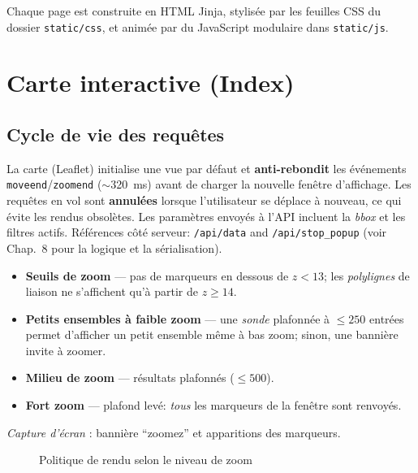 Chaque page est construite en HTML Jinja, stylisée par les feuilles CSS du dossier \texttt{static/css}, et animée par du JavaScript modulaire dans \texttt{static/js}.

\section{Carte interactive (Index)}

\subsection{Cycle de vie des requêtes}
La carte (Leaflet) initialise une vue par défaut et \textbf{anti-rebondit} les événements \texttt{moveend}/\texttt{zoomend} (\(\sim\)320~ms) avant de charger la nouvelle fenêtre d'affichage. Les requêtes en vol sont \textbf{annulées} lorsque l'utilisateur se déplace à nouveau, ce qui évite les rendus obsolètes. Les paramètres envoyés à l'API incluent la \textit{bbox} et les filtres actifs. Références côté serveur: \texttt{/api/data} and \texttt{/api/stop\_popup} (voir Chap.~8 pour la logique et la sérialisation).

\begin{itemize}
  \item \textbf{Seuils de zoom} — pas de marqueurs en dessous de \(z<13\); les \textit{polylignes} de liaison ne s'affichent qu'à partir de \(z\ge 14\).
  \item \textbf{Petits ensembles à faible zoom} — une \textit{sonde} plafonnée à \(\leq 250\) entrées permet d'afficher un petit ensemble même à bas zoom; sinon, une bannière invite à zoomer.
  \item \textbf{Milieu de zoom} — résultats plafonnés (\(\leq 500\)).
  \item \textbf{Fort zoom} — plafond levé: \emph{tous} les marqueurs de la fenêtre sont renvoyés.
\end{itemize}

\noindent
\textit{Capture d'écran} : bannière ``zoomez'' et apparitions des marqueurs.

\begin{figure}[h]
  \centering
  \caption{Politique de rendu selon le niveau de zoom}
  \label{fig:frontend-zoom-banner}
\end{figure}


